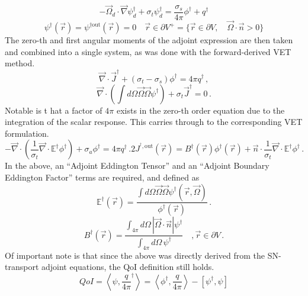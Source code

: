 \documentclass[12pt]{report}
\newcommand{\vr}{\vec{r}}
\newcommand{\vO}{\vec{\Omega}}
\newcommand{\bra}{\left\langle}
\newcommand{\ket}{\right\rangle}
\newcommand{\sbra}{\left[}
\newcommand{\sket}{\right]}
\renewcommand{\div}{\vec{\nabla} \cdot}
\newcommand{\grad}{\vec{\nabla}}
\newcommand{\bound}{\partial V}
\newcommand{\vn}{\vec{n}}
\newcommand{\Edd}{\mathbb{E}}
\newcommand{\BEdd}{B}
\newcommand{\sigt}{\sigma_t}
\newcommand{\sigs}{\sigma_s}
\newcommand{\siga}{\sigma_a}
\newcommand{\angSource}{\frac{q}{4 \pi}}
\newcommand{\scalResp}{q^\dag}
\begin{document}
\begin{equation}
\label{snAdjAlt}
- \vO_d \cdot \grad \psi^\dag_d + \sigt \psi^\dag_d = \frac{\sigs}{4 \pi} \phi^\dag + \scalResp
\end{equation}
%
\begin{equation}
\psi^\dag(\vr) = \psi^{\dag \text{out}}(\vr)=0 \quad \vr \in \partial V^{+} = \{  \vr \in \bound , \quad \vO \cdot \vec{n} > 0 \}
\end{equation}
The zero-th and first angular moments of the adjoint expression are then taken and combined into a single system, as was done with the forward-derived VET method.
\begin{equation}
\label{0amAlt}
\div \vec{J}^\dag + (\sigt-\sigs) \phi^\dag  = 4\pi \scalResp \,,
\end{equation}
%
\begin{equation}
\label{1amAlt}
\div \left(  \int d\Omega \vO \vO \psi^\dag  \right) + \sigt \vec{J}^\dag  = 0 \,.
\end{equation}
%
Notable is t hat a factor of $4 \pi$ exists in the zero-th order equation due to the integration of the scalar response. This carries through to the corresponding VET formulation.
\begin{subequations}
\begin{equation}
\label{TranAdjVEFForm}
- \div \left( \frac{1}{\sigt}\div \Edd^\dag \phi^\dag  \right) + \siga \phi^\dag  = 4\pi \scalResp  \,.
\end{equation}
\begin{equation}
2 J^{^\dag,\text{out}}(\vr) = \BEdd^\dag(\vr) \phi^\dag(\vr)  + \vn \cdot \frac{1}{\sigt} \div \Edd^\dag  \phi^\dag  \,.
\end{equation}
\end{subequations}
In the above, an ``Adjoint Eddington Tensor'' and an ``Adjoint Boundary Eddington Factor'' terms are required, and defined as
\begin{equation}
\label{AdjEddDef}
\Edd^\dag(\vr)=\frac{\int d\Omega \vO \vO \psi^\dag(\vr,\vO)}{\phi^\dag(\vr)} \, .
\end{equation} 
\begin{equation}
\BEdd^\dag(\vr) = \frac{\int_{4 \pi} d\Omega \, | \vO \cdot \vn | \psi^\dag}{\int_{4\pi} d\Omega \, \psi^\dag} \quad , \vr \in \bound \,.
\end{equation}
Of important note is that since the above was directly derived from the SN-transport adjoint equations, the QoI definition  still holds.
\begin{equation}
\label{AdjQoIAlt}
QoI = \bra \psi , \angSource^\dag \ket = \bra \phi^\dag , \angSource \ket - \sbra \psi^\dag,  \psi \sket 
\end{equation}
\end{document}
